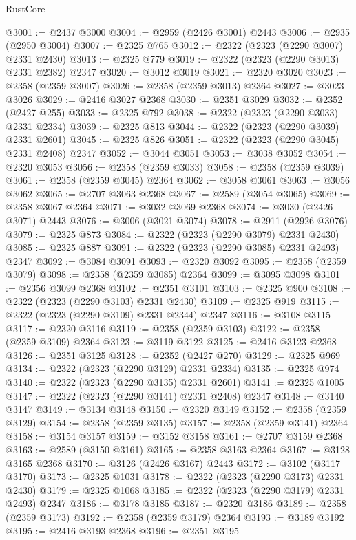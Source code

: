 \begin{lexlean}{RustCore}
\begin{coremodule}
@3001 := @2437 @3000
@3004 := @2959 (@2426 @3001) @2443
@3006 := @2935 (@2950 @3004)
@3007 := @2325 @765
@3012 := @2322 (@2323 (@2290 @3007) @2331 @2430)
@3013 := @2325 @779
@3019 := @2322 (@2323 (@2290 @3013) @2331 @2382) @2347
@3020 := @3012 @3019
@3021 := @2320 @3020
@3023 := @2358 (@2359 @3007)
@3026 := @2358 (@2359 @3013) @2364
@3027 := @3023 @3026
@3029 := @2416 @3027 @2368
@3030 := @2351 @3029
@3032 := @2352 (@2427 @255)
@3033 := @2325 @792
@3038 := @2322 (@2323 (@2290 @3033) @2331 @2334)
@3039 := @2325 @813
@3044 := @2322 (@2323 (@2290 @3039) @2331 @2601)
@3045 := @2325 @826
@3051 := @2322 (@2323 (@2290 @3045) @2331 @2408) @2347
@3052 := @3044 @3051
@3053 := @3038 @3052
@3054 := @2320 @3053
@3056 := @2358 (@2359 @3033)
@3058 := @2358 (@2359 @3039)
@3061 := @2358 (@2359 @3045) @2364
@3062 := @3058 @3061
@3063 := @3056 @3062
@3065 := @2707 @3063 @2368
@3067 := @2589 (@3054 @3065)
@3069 := @2358 @3067 @2364
@3071 := @3032 @3069 @2368
@3074 := @3030 (@2426 @3071) @2443
@3076 := @3006 (@3021 @3074)
@3078 := @2911 (@2926 @3076)
@3079 := @2325 @873
@3084 := @2322 (@2323 (@2290 @3079) @2331 @2430)
@3085 := @2325 @887
@3091 := @2322 (@2323 (@2290 @3085) @2331 @2493) @2347
@3092 := @3084 @3091
@3093 := @2320 @3092
@3095 := @2358 (@2359 @3079)
@3098 := @2358 (@2359 @3085) @2364
@3099 := @3095 @3098
@3101 := @2356 @3099 @2368
@3102 := @2351 @3101
@3103 := @2325 @900
@3108 := @2322 (@2323 (@2290 @3103) @2331 @2430)
@3109 := @2325 @919
@3115 := @2322 (@2323 (@2290 @3109) @2331 @2344) @2347
@3116 := @3108 @3115
@3117 := @2320 @3116
@3119 := @2358 (@2359 @3103)
@3122 := @2358 (@2359 @3109) @2364
@3123 := @3119 @3122
@3125 := @2416 @3123 @2368
@3126 := @2351 @3125
@3128 := @2352 (@2427 @270)
@3129 := @2325 @969
@3134 := @2322 (@2323 (@2290 @3129) @2331 @2334)
@3135 := @2325 @974
@3140 := @2322 (@2323 (@2290 @3135) @2331 @2601)
@3141 := @2325 @1005
@3147 := @2322 (@2323 (@2290 @3141) @2331 @2408) @2347
@3148 := @3140 @3147
@3149 := @3134 @3148
@3150 := @2320 @3149
@3152 := @2358 (@2359 @3129)
@3154 := @2358 (@2359 @3135)
@3157 := @2358 (@2359 @3141) @2364
@3158 := @3154 @3157
@3159 := @3152 @3158
@3161 := @2707 @3159 @2368
@3163 := @2589 (@3150 @3161)
@3165 := @2358 @3163 @2364
@3167 := @3128 @3165 @2368
@3170 := @3126 (@2426 @3167) @2443
@3172 := @3102 (@3117 @3170)
@3173 := @2325 @1031
@3178 := @2322 (@2323 (@2290 @3173) @2331 @2430)
@3179 := @2325 @1068
@3185 := @2322 (@2323 (@2290 @3179) @2331 @2493) @2347
@3186 := @3178 @3185
@3187 := @2320 @3186
@3189 := @2358 (@2359 @3173)
@3192 := @2358 (@2359 @3179) @2364
@3193 := @3189 @3192
@3195 := @2416 @3193 @2368
@3196 := @2351 @3195

\end{coremodule}
\end{lexlean}
